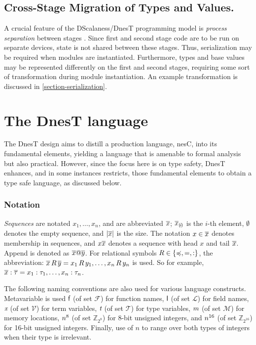 \subsection{Cross-Stage Migration of Types and Values.} 

A crucial feature of the DScalaness/DnesT programming model is \emph{process separation} between
stages \cite{FramedML}. Since first and second stage code are to be run on separate devices,
state is not shared between these stages. Thus, serialization may be required when modules are
instantiated. Furthermore, types and base values may be represented differently on the first and
second stages, requiring some sort of transformation during module instantiation. An example
transformation is discussed in \autoref{section-serialization}.

\section{The DnesT language}
\label{section-dnest-theory}
 
The DnesT design aims to distill a production language, nesC, into its fundamental elements,
yielding a language that is amenable to formal analysis but also practical. However, since the
focus here is on type safety, DnesT enhances, and in some instances restricts, those fundamental
elements to obtain a type safe language, as discussed below.

\subsubsection{Notation}

\emph{Sequences} are notated $x_1,\ldots,x_n$, and are abbreviated $\overline{x}$;
$\overline{x}_{(\mskip -2.5mu i\mskip -2.5mu)}$ is the $i$-th element, $\emptyset$ denotes the empty sequence, and
$|\overline{x}|$ is the size. The notation $x \in \overline{x}$ denotes membership in sequences, and
$x\overline{x}$ denotes a sequence with head $x$ and tail $\overline{x}$. Append is denoted as
$\overline{x}@\overline{y}$. For relational symbols $R \in \{ \preccurlyeq, =, : \}$, the abbreviation:
$\overline{x}\, R\, \overline{y} = x_1\, R\, y_1, \ldots, x_n\, R\, y_n$ is used. So for example,
$\overline{x} : \overline{\tau} = x_1 : \tau_1,\ldots,x_n : \tau_n$.

The following naming conventions are also used for various language constructs. Metavariable is
used $\textsf{f}$ (of set $\mathcal{F}$) for function names, $\textsf{l}$ (of set $\mathcal{L}$) for
field names, $\textit{x}$ (of set $\mathcal{V}$) for term variables, $\textit{t}$ (of set $\mathcal{T}$)
for type variables, $m$ (of set $\mathcal{M}$) for memory locations, $n^{8}$ (of set
$\mathbb{Z}_{2^8}$) for 8-bit unsigned integers, and $n^{16}$ (of set $\mathbb{Z}_{2^{16}}$)
for 16-bit unsigned integers. Finally, use of $n$ to range over both types of integers when
their type is irrelevant.

